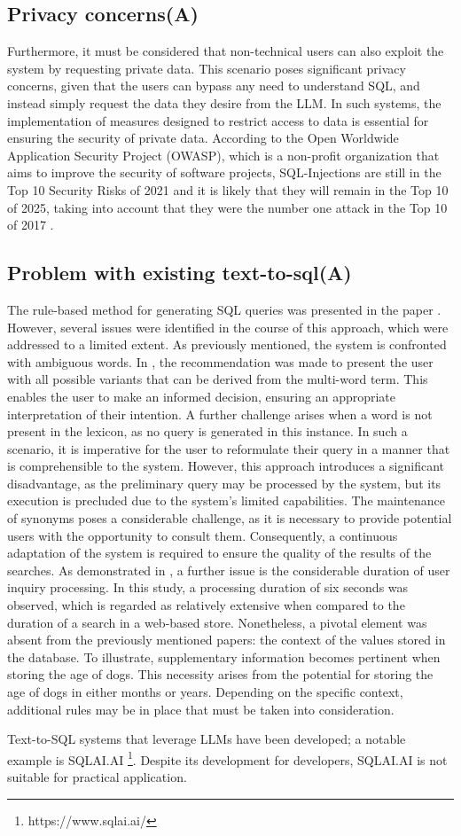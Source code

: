 \documentclass[../../submission.tex]{subfiles}
\begin{document}
\subsection{Privacy concerns(A)}
Furthermore, it must be considered that non-technical users can also exploit the system by requesting private data. 
This scenario poses significant privacy concerns, given that the users can bypass any need to understand SQL, and instead simply request the data they desire from the LLM. 
In such systems, the implementation of measures designed to restrict access to data is essential for ensuring the security of private data.
According to the Open Worldwide Application Security Project (OWASP), which is a 
non-profit organization that aims to improve the security of software projects,
SQL-Injections are still in the Top 10 Security Risks of 2021 and it is likely that 
they will remain in the Top 10 of 2025, taking into account that they were the number
one attack in the Top 10 of 2017 \cite{owaspfoundationOWASPTopTen2024}.

\subsection{Problem with existing text-to-sql(A)}
The rule-based method for generating SQL queries was presented in the paper  \cite{popescuEtalTowardsTheoryOfNaturalLanguage}. 
However, several issues were identified in the course of this approach, which were addressed to a limited extent. 
As previously mentioned, the system is confronted with ambiguous words. 
In  \cite{popescuEtalTowardsTheoryOfNaturalLanguage}, the recommendation was made to present the user with all possible variants that can be derived from the multi-word term.  
This enables the user to make an informed decision, ensuring an appropriate interpretation of their intention. 
A further challenge arises when a word is not present in the lexicon, as no query is generated in this instance. 
In such a scenario, it is imperative for the user to reformulate their query in a manner that is comprehensible to the system. 
However, this approach introduces a significant disadvantage, as the preliminary query may be processed by the system, but its execution is precluded due to the system's limited capabilities. 
The maintenance of synonyms poses a considerable challenge, as it is necessary to provide potential users with the opportunity to consult them. Consequently, a continuous adaptation of the system is required to ensure the quality of the results of the searches. 
As demonstrated in \cite{popescuEtalTowardsTheoryOfNaturalLanguage}, a further issue is the considerable duration of user inquiry processing. In this study, a processing duration of six seconds was observed, which is regarded as relatively extensive when compared to the duration of a search in a web-based store.
Nonetheless, a pivotal element was absent from the previously mentioned papers: the context of the values stored in the database. 
To illustrate, supplementary information becomes pertinent when storing the age of dogs. 
This necessity arises from the potential for storing the age of dogs in either months or years. 
Depending on the specific context, additional rules may be in place that must be taken into consideration. 

Text-to-SQL systems that leverage LLMs have been developed; a notable example is SQLAI.AI \footnote{https://www.sqlai.ai/}. 
Despite its development for developers, SQLAI.AI is not suitable for practical application.
\end{document}
